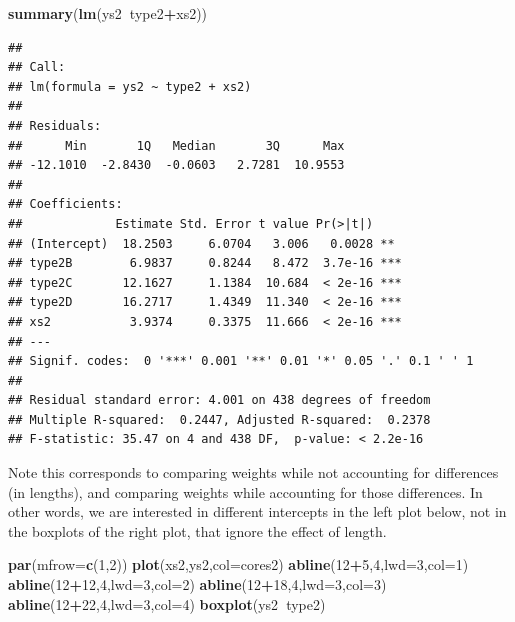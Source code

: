 \documentclass[
]{book}
\newenvironment{Shaded}{\begin{snugshade}}{\end{snugshade}}
\newcommand{\DataTypeTok}[1]{\textcolor[rgb]{0.13,0.29,0.53}{#1}}
\newcommand{\DecValTok}[1]{\textcolor[rgb]{0.00,0.00,0.81}{#1}}
\newcommand{\KeywordTok}[1]{\textcolor[rgb]{0.13,0.29,0.53}{\textbf{#1}}}
\newcommand{\NormalTok}[1]{#1}
\newcommand{\OperatorTok}[1]{\textcolor[rgb]{0.81,0.36,0.00}{\textbf{#1}}}
\begin{document}
\begin{Shaded}
\begin{Highlighting}[]
\KeywordTok{summary}\NormalTok{(}\KeywordTok{lm}\NormalTok{(ys2}\OperatorTok{~}\NormalTok{type2}\OperatorTok{+}\NormalTok{xs2))}
\end{Highlighting}
\end{Shaded}

\begin{verbatim}
## 
## Call:
## lm(formula = ys2 ~ type2 + xs2)
## 
## Residuals:
##      Min       1Q   Median       3Q      Max 
## -12.1010  -2.8430  -0.0603   2.7281  10.9553 
## 
## Coefficients:
##             Estimate Std. Error t value Pr(>|t|)    
## (Intercept)  18.2503     6.0704   3.006   0.0028 ** 
## type2B        6.9837     0.8244   8.472  3.7e-16 ***
## type2C       12.1627     1.1384  10.684  < 2e-16 ***
## type2D       16.2717     1.4349  11.340  < 2e-16 ***
## xs2           3.9374     0.3375  11.666  < 2e-16 ***
## ---
## Signif. codes:  0 '***' 0.001 '**' 0.01 '*' 0.05 '.' 0.1 ' ' 1
## 
## Residual standard error: 4.001 on 438 degrees of freedom
## Multiple R-squared:  0.2447,	Adjusted R-squared:  0.2378 
## F-statistic: 35.47 on 4 and 438 DF,  p-value: < 2.2e-16
\end{verbatim}

Note this corresponds to comparing weights while not accounting for differences (in lengths), and comparing weights while accounting for those differences. In other words, we are interested in different intercepts in the left plot below, not in the boxplots of the right plot, that ignore the effect of length.

\begin{Shaded}
\begin{Highlighting}[]
\KeywordTok{par}\NormalTok{(}\DataTypeTok{mfrow=}\KeywordTok{c}\NormalTok{(}\DecValTok{1}\NormalTok{,}\DecValTok{2}\NormalTok{))}
\KeywordTok{plot}\NormalTok{(xs2,ys2,}\DataTypeTok{col=}\NormalTok{cores2)}
\KeywordTok{abline}\NormalTok{(}\DecValTok{12}\OperatorTok{+}\DecValTok{5}\NormalTok{,}\DecValTok{4}\NormalTok{,}\DataTypeTok{lwd=}\DecValTok{3}\NormalTok{,}\DataTypeTok{col=}\DecValTok{1}\NormalTok{)}
\KeywordTok{abline}\NormalTok{(}\DecValTok{12}\OperatorTok{+}\DecValTok{12}\NormalTok{,}\DecValTok{4}\NormalTok{,}\DataTypeTok{lwd=}\DecValTok{3}\NormalTok{,}\DataTypeTok{col=}\DecValTok{2}\NormalTok{)}
\KeywordTok{abline}\NormalTok{(}\DecValTok{12}\OperatorTok{+}\DecValTok{18}\NormalTok{,}\DecValTok{4}\NormalTok{,}\DataTypeTok{lwd=}\DecValTok{3}\NormalTok{,}\DataTypeTok{col=}\DecValTok{3}\NormalTok{)}
\KeywordTok{abline}\NormalTok{(}\DecValTok{12}\OperatorTok{+}\DecValTok{22}\NormalTok{,}\DecValTok{4}\NormalTok{,}\DataTypeTok{lwd=}\DecValTok{3}\NormalTok{,}\DataTypeTok{col=}\DecValTok{4}\NormalTok{)}
\KeywordTok{boxplot}\NormalTok{(ys2}\OperatorTok{~}\NormalTok{type2)}
\end{Highlighting}
\end{Shaded}
\end{document}
